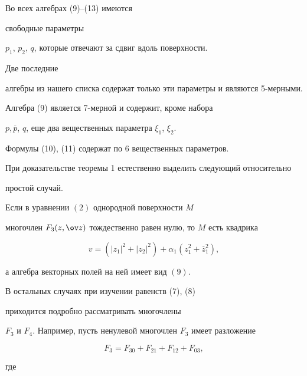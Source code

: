 \begin{notenonum}


Во всех алгебрах (9)--(13) имеются 


свободные параметры


$ p_1$, $p_2$, $q $, которые отвечают за сдвиг вдоль поверхности. 


Две последние


алгебры из нашего списка содержат только эти параметры и являются 5-мерными.


Алгебра (9) является 7-мерной и содержит, кроме набора 


$ p,\overline p$, $q $, еще два вещественных параметра $ \xi_1$, $\xi_2 $.


Формулы (10), (11) содержат по 6 вещественных параметров.


\end{notenonum}








При доказательстве теоремы 1 естественно выделить следующий относительно 


простой случай.





\begin{prop}


Если в уравнении $(2)$ однородной поверхности $ M $ 


многочлен $ F_3(z,\ov z) $ тождественно равен нулю, то $ M $ есть квадрика 


$$


 v = ( | z_1 |^2 + |z_2 |^2 ) + \alpha_1 ( z_1^2 + \overline z_1^2 ),


$$


а алгебра векторных полей на ней имеет вид $(9)$.


\end{prop}





 В остальных случаях при изучении равенств (7), (8) 


приходится подробно рассматривать многочлены 


$ F_3 $ и $ F_4 $. Например, пусть ненулевой многочлен $ F_3 $ имеет разложение


$$ 


 F_3 = F_{30} + F_{21} + F_{12} + F_{03},


$$ 


где


